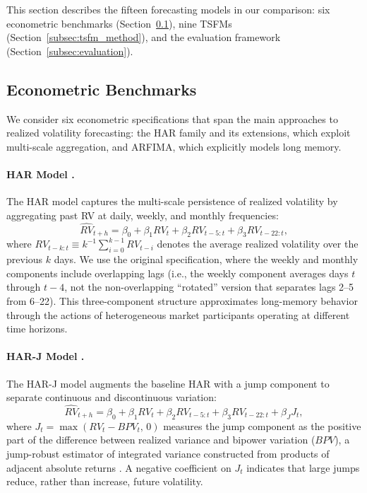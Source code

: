 \documentclass[12pt]{article}
\begin{document}
This section describes the fifteen forecasting models in our comparison: six econometric benchmarks (Section~\ref{subsec:benchmarks}), nine TSFMs (Section~\ref{subsec:tsfm_method}), and the evaluation framework (Section~\ref{subsec:evaluation}).

\subsection{Econometric Benchmarks}
\label{subsec:benchmarks}

We consider six econometric specifications that span the main approaches to realized volatility forecasting: the HAR family and its extensions, which exploit multi-scale aggregation, and ARFIMA, which explicitly models long memory.

\paragraph{HAR Model \citep{corsi2009}.}
The HAR model captures the multi-scale persistence of realized volatility by aggregating past RV at daily, weekly, and monthly frequencies:
\begin{equation}
  \widehat{RV}_{t+h} = \beta_0 + \beta_1 RV_t + \beta_2 RV_{t-5:t} + \beta_3 RV_{t-22:t},
  \label{eq:har}
\end{equation}
where $RV_{t-k:t} \equiv k^{-1}\sum_{i=0}^{k-1} RV_{t-i}$ denotes the average realized volatility over the previous $k$ days. We use the original specification, where the weekly and monthly components include overlapping lags (i.e., the weekly component averages days $t$ through $t-4$, not the non-overlapping ``rotated'' version that separates lags 2--5 from 6--22). This three-component structure approximates long-memory behavior through the actions of heterogeneous market participants operating at different time horizons.

\paragraph{HAR-J Model \citep{andersen2007roughing}.}
The HAR-J model augments the baseline HAR with a jump component to separate continuous and discontinuous variation:
\begin{equation}
  \widehat{RV}_{t+h} = \beta_0 + \beta_1 RV_t + \beta_2 RV_{t-5:t} + \beta_3 RV_{t-22:t} + \beta_J J_t,
  \label{eq:har_j}
\end{equation}
where $J_t = \max(RV_t - BPV_t,\, 0)$ measures the jump component as the positive part of the difference between realized variance and bipower variation ($BPV$), a jump-robust estimator of integrated variance constructed from products of adjacent absolute returns \citep{barndorffnielsen2004bipower}. A negative coefficient on $J_t$ indicates that large jumps reduce, rather than increase, future volatility.
\end{document}
